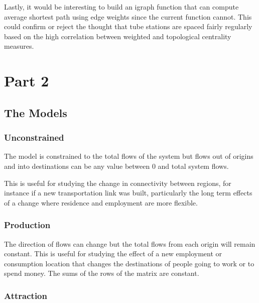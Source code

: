\documentclass[11pt]{article} %
\begin{document}
Lastly, it would be interesting to build an igraph function that can compute average shortest path using edge weights since the current function cannot. This could confirm or reject the thought that tube stations are spaced fairly regularly based on the high correlation between weighted and topological centrality measures. 



\pagebreak

\section{Part 2}

\subsection{The Models}

\subsubsection{Unconstrained}

The model is constrained to the total flows of the system but flows out of origins and into destinations can be any value between 0 and total system flows. 

This is useful for studying the change in connectivity between regions, for instance if a new transportation link was built, particularly the long term effects of a change where residence and employment are more flexible. 

\subsubsection{Production}

The direction of flows can change but the total flows from each origin will remain constant. This is useful for studying the effect of a new employment or consumption location that changes the destinations of people going to work or to spend money. The sums of the rows of the matrix are constant. 

\subsubsection{Attraction}
\end{document}
